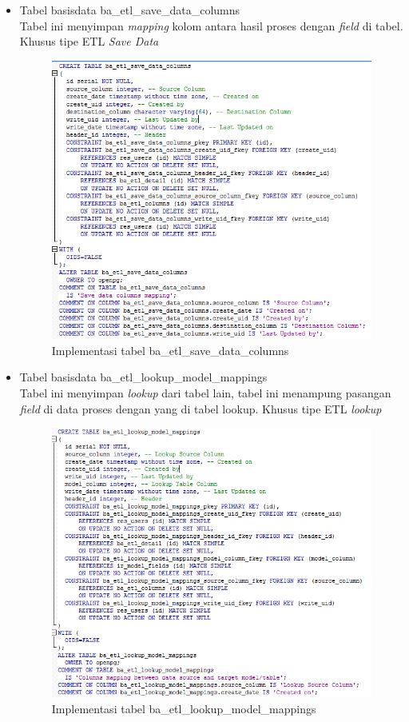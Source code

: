 \begin{itemize}
		\item Tabel basisdata ba\_etl\_save\_data\_columns\\
		Tabel ini menyimpan \textit{mapping} kolom antara hasil proses dengan \textit{field} di tabel. Khusus tipe ETL \textit{Save Data} 
		\begin{figure}[H]
		\centering
		\includegraphics[scale=0.5]{Gambar/tabel-ba-etl-save-data-columns}
		\caption{Implementasi tabel ba\_etl\_save\_data\_columns}
		\end{figure}
		
		\item Tabel basisdata ba\_etl\_lookup\_model\_mappings\\
		Tabel ini menyimpan \textit{lookup} dari tabel lain, tabel ini menampung pasangan \textit{field} di data proses dengan yang di tabel lookup. Khusus tipe ETL \textit{lookup}
		\begin{figure}[H]
		\centering
		\includegraphics[scale=0.5]{Gambar/tabel-ba-etl-lookup-model-mappings}
		\caption{Implementasi tabel ba\_etl\_lookup\_model\_mappings}
		\end{figure}
		

\end{itemize}
